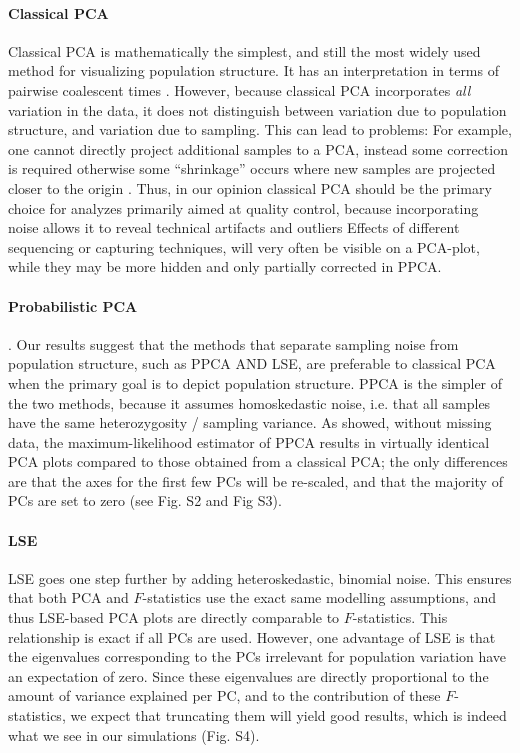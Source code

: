 \documentclass[12pt, letterpaper]{article}
\begin{document}
\paragraph{Classical PCA}
Classical PCA is mathematically the simplest, and still the most widely used method for visualizing population structure. It has an interpretation in terms of pairwise coalescent times \citep{mcvean_genealogical_2009}. However, because classical PCA incorporates \emph{all} variation in the data, it does not distinguish between variation due to population structure, and variation due to sampling. This can lead to problems: For example, one cannot directly project additional samples to a PCA, instead some correction is required otherwise some ``shrinkage'' occurs where new samples are projected closer to the origin \citep{patterson_population_2006, wang_improved_2015}.  Thus, in our opinion classical PCA should be the primary choice for analyzes primarily aimed at quality control, because incorporating noise allows it to reveal technical artifacts and outliers Effects of different sequencing or capturing techniques, will very often be visible on a PCA-plot, while they may be more hidden and only partially corrected in PPCA.

\paragraph{Probabilistic PCA}. Our results suggest that the methods that separate sampling noise from population structure, such as PPCA AND LSE, are preferable to classical PCA when the primary goal is to depict population structure. PPCA is the simpler of the two methods, because it assumes homoskedastic noise, i.e. that all samples have the same heterozygosity / sampling variance. As \cite{tipping_probabilistic_1999-1} showed, without missing data, the maximum-likelihood estimator of PPCA results in virtually identical PCA plots compared to those obtained from a classical PCA; the only differences are that the axes for the first few PCs will be re-scaled, and that the majority of PCs are set to zero (see Fig. S2 and Fig S3).


\paragraph{LSE}
LSE goes one step further by adding heteroskedastic, binomial noise. This ensures that both PCA and $F$-statistics use the exact same modelling assumptions, and thus LSE-based PCA plots are directly comparable to $F$-statistics. This relationship is exact if all PCs are used. However, one advantage of LSE is that the eigenvalues corresponding to the PCs irrelevant for population variation have an expectation of zero. Since these eigenvalues are directly proportional to the amount of variance explained per PC, and to the contribution of these $F$-statistics, we expect that truncating them will yield good results, which is indeed what we see in our simulations (Fig. S4). 
\end{document}
